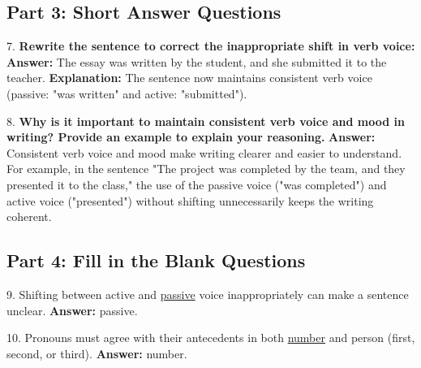 \documentclass[12pt]{article}
\begin{document}
\subsection*{Part 3: Short Answer Questions}

7. \textbf{Rewrite the sentence to correct the inappropriate shift in verb voice:}  
\textbf{Answer:} The essay was written by the student, and she submitted it to the teacher.  
\textbf{Explanation:} The sentence now maintains consistent verb voice (passive: "was written" and active: "submitted").

\vspace{1cm}
8. \textbf{Why is it important to maintain consistent verb voice and mood in writing? Provide an example to explain your reasoning.}  
\textbf{Answer:} Consistent verb voice and mood make writing clearer and easier to understand. For example, in the sentence "The project was completed by the team, and they presented it to the class," the use of the passive voice ("was completed") and active voice ("presented") without shifting unnecessarily keeps the writing coherent.

\subsection*{Part 4: Fill in the Blank Questions}

9. Shifting between active and \underline{passive} voice inappropriately can make a sentence unclear.  
\textbf{Answer:} passive.

10. Pronouns must agree with their antecedents in both \underline{number} and person (first, second, or third).  
\textbf{Answer:} number.
\end{document}
